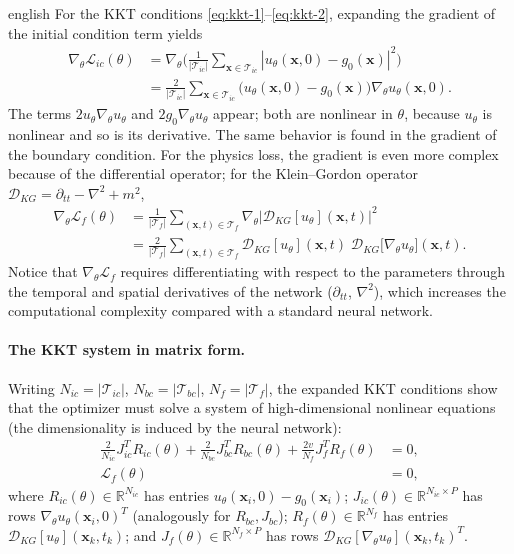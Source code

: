 \documentclass[11pt,letterpaper,twoside,openright]{book} %
\newcommand{\abs}[1]{\left\lvert #1 \right\rvert}
\newcommand{\Loss}{\mathcal{L}}
\newcommand{\T}{\mathcal{T}}
\begin{document}
\begin{hyphenrules}{english}
For the KKT conditions \eqref{eq:kkt-1}--\eqref{eq:kkt-2}, expanding the gradient of the initial
condition term yields
\begin{align}
  \nabla_\theta\Loss_{ic}(\theta)
  &=\nabla_\theta\Big(\frac{1}{\abs{\T_{ic}}}\sum_{\mathbf{x}\in\T_{ic}}\abs{u_\theta(\mathbf{x},0)-g_0(\mathbf{x})}^2\Big) \label{eq:grad-ic-1}\\
  &=\frac{2}{\abs{\T_{ic}}}\sum_{\mathbf{x}\in\T_{ic}}\big(u_\theta(\mathbf{x},0)-g_0(\mathbf{x})\big)\nabla_\theta u_\theta(\mathbf{x},0). \label{eq:grad-ic-2}
\end{align}
The terms $2u_\theta\nabla_\theta u_\theta$ and $2g_0\nabla_\theta u_\theta$ appear; both are nonlinear in
$\theta$, because $u_\theta$ is nonlinear and so is its derivative. The same behavior is found in the
gradient of the boundary condition. For the physics loss, the gradient is even more complex because of
the differential operator; for the Klein--Gordon operator
$\mathcal{D}_{KG}=\partial_{tt}-\nabla^2+m^2$,
\begin{align}
  \nabla_\theta\Loss_f(\theta)
  &=\frac{1}{\abs{\T_f}}\sum_{(\mathbf{x},t)\in\T_f}\nabla_\theta\abs{\mathcal{D}_{KG}[u_\theta](\mathbf{x},t)}^2 \label{eq:grad-f-1}\\
  &=\frac{2}{\abs{\T_f}}\sum_{(\mathbf{x},t)\in\T_f}\mathcal{D}_{KG}[u_\theta](\mathbf{x},t)\;
    \mathcal{D}_{KG}\big[\nabla_\theta u_\theta\big](\mathbf{x},t). \label{eq:grad-f-2}
\end{align}
Notice that $\nabla_\theta\Loss_f$ requires differentiating with respect to the parameters through the
temporal and spatial derivatives of the network ($\partial_{tt}$, $\nabla^2$), which increases the
computational complexity compared with a standard neural network.

\paragraph{The KKT system in matrix form.}
Writing $N_{ic}=\abs{\T_{ic}}$, $N_{bc}=\abs{\T_{bc}}$, $N_f=\abs{\T_f}$, the expanded KKT conditions
show that the optimizer must solve a system of high-dimensional nonlinear equations (the
dimensionality is induced by the neural network):
\begin{align}
  \frac{2}{N_{ic}}J_{ic}^{T}R_{ic}(\theta)+\frac{2}{N_{bc}}J_{bc}^{T}R_{bc}(\theta)
  +\frac{2v}{N_f}J_f^{T}R_f(\theta)&=0, \label{eq:kkt-matrix-1}\\
  \Loss_f(\theta)&=0, \label{eq:kkt-matrix-2}
\end{align}
where $R_{ic}(\theta)\in\mathbb{R}^{N_{ic}}$ has entries $u_\theta(\mathbf{x}_i,0)-g_0(\mathbf{x}_i)$;
$J_{ic}(\theta)\in\mathbb{R}^{N_{ic}\times P}$ has rows $\nabla_\theta u_\theta(\mathbf{x}_i,0)^{T}$ (analogously for
$R_{bc},J_{bc}$); $R_f(\theta)\in\mathbb{R}^{N_f}$ has entries $\mathcal{D}_{KG}[u_\theta](\mathbf{x}_k,t_k)$; and
$J_f(\theta)\in\mathbb{R}^{N_f\times P}$ has rows $\mathcal{D}_{KG}[\nabla_\theta u_\theta](\mathbf{x}_k,t_k)^{T}$.


\end{hyphenrules}
\end{document}
